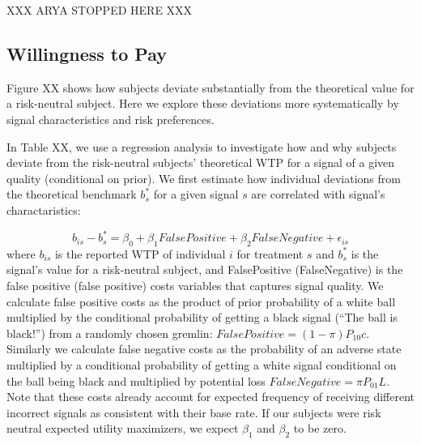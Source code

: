 \documentclass[12pt,a4paper]{article}
\newcommand{\agt}[1]{{\color{OliveGreen}#1}}
\begin{document}


\newpage\clearpage

\agt{XXX ARYA STOPPED HERE XXX}

\subsection{Willingness to Pay}

Figure XX shows how subjects deviate substantially from the theoretical value for a risk-neutral subject. Here we explore these deviations more systematically by signal characteristics and risk preferences. 






In Table XX, we use a regression analysis to investigate how and why subjects deviate from the risk-neutral subjects’ theoretical WTP for a signal of a given quality (conditional on prior). We first estimate how individual deviations from the theoretical benchmark $b^*_s$ for a given signal $s$ are correlated with signal's charactaristics:

\[b_{is} - b^*_s = \beta_0 + \beta_1 FalsePositive + \beta_2 FalseNegative + \epsilon_{is}\]
where $b_{is}$ is the reported WTP of individual $i$ for treatment $s$ and $b^*_s$ is the signal's value for a risk-neutral subject, and FalsePositive (FalseNegative) is the false positive (false positive) costs variables that captures signal quality. We calculate false positive costs as the product of prior probability of a white ball multiplied by the conditional probability of getting a black signal (“The ball is black!”) from a randomly chosen gremlin: $FalsePositive=(1-\pi) P_{10}c$. Similarly we calculate false negative costs as the probability of an adverse state multiplied by a conditional probability of getting a white signal conditional on the ball being black and multiplied by potential loss $FalseNegative=\pi P_{01}L$. Note that these costs already account for expected frequency of receiving different incorrect signals as consistent with their base rate. If our subjects were risk neutral expected utility maximizers, we expect $\beta_1$ and $\beta_2$ to be zero.
\end{document}
